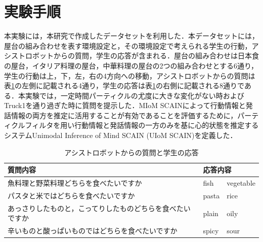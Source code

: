 \section{実験手順}

\par
本実験には，本研究で作成したデータセットを利用した．本データセットには，屋台の組み合わせを表す環境設定と，その環境設定で考えられる学生の行動，アシストロボットからの質問，学生の応答が含まれる．屋台の組み合わせは日本食の屋台，イタリア料理の屋台，中華料理の屋台の2つの組み合わせとする6通り，学生の行動は上，下，左，右の4方向への移動，アシストロボットからの質問は表\ref{tab:q_a}の左側に記載される4通り，学生の応答は表\ref{tab:q_a}の右側に記載される8通りである．本実験では，一定時間パーティクルの尤度に大きな変化がない時およびTruck1を通り過ぎた時に質問を提示した．MIoM SCAINによって行動情報と発話情報の両方を推定に活用することが有効であることを評価するために，パーティクルフィルタを用い行動情報と発話情報の一方のみを基に心的状態を推定するシステムUnimodal Inference of Mind SCAIN (UIoM SCAIN)を定義した．
\begin{table}[htb]
  \begin{center}
  \caption{アシストロボットからの質問と学生の応答}
  \label{tab:q_a}
  \begin{tabular}{lll} \hline
    質問内容&\multicolumn{2}{l}{応答内容}\\\hline
    魚料理と野菜料理どちらを食べたいですか&fish&vegetable\\
    パスタと米ではどちらを食べたいですか&pasta&rice\\
    あっさりしたものと，こってりしたものどちらを食べたいですか&plain&oily\\
    辛いものと酸っぱいものではどちらを食べたいですか&spicy&sour\\\hline
  \end{tabular}
\end{center}
\end{table}

